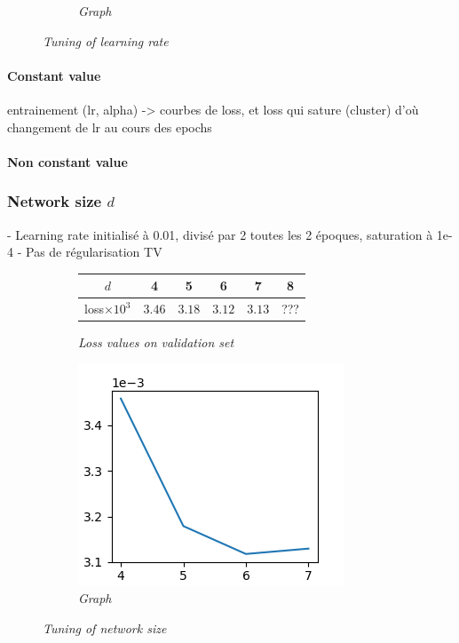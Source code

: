 \documentclass{article}
\begin{document}
\begin{figure}[!ht]
\begin{subfigure}{.33\linewidth}
                \caption{\textit{Graph}}
            \end{subfigure}
            \caption{\textit{Tuning of learning rate}}
        \end{figure}


        \paragraph{Constant value}
    entrainement (lr, alpha) -> courbes de loss, et loss qui sature (cluster) d'où changement de lr au cours des epochs
        \paragraph{Non constant value}
        \subsubsection{Network size $d$}
        - Learning rate initialisé à 0.01, divisé par 2 toutes les 2 époques, saturation à 1e-4
        - Pas de régularisation TV

        \begin{figure}[!ht]
            \begin{subfigure}{.49\linewidth}
                \center
                \begin{tabular}{|c|c|c|c|c|c|}
                    \hline
                    $d$ & 4 & 5 & 6 & 7 & 8 \\
                    \hline \hline
                    loss$\times 10^3$ & $3.46$ & $3.18$ & $3.12$ & $3.13$ & ??? \\
                    \hline
                \end{tabular}
                \caption{\textit{Loss values on validation set}}
            \end{subfigure}
            \begin{subfigure}{.49\linewidth}
                \centering
                \includegraphics[width=.8\linewidth]{pics/hpp-d.png}
                \caption{\textit{Graph}}
            \end{subfigure}
            \caption{\textit{Tuning of network size}}
        \end{figure}
\end{document}
